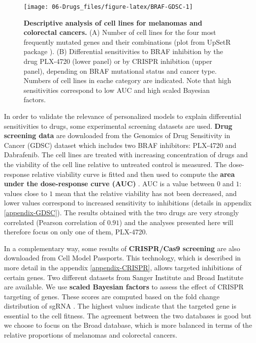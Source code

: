 \documentclass[a4paper,12pt,twoside,onecolumn,openright,final,oldfontcommands]{memoir}
\begin{document}
\begin{figure}

{\centering \texttt{[image: 06-Drugs\_files/figure-latex/BRAF-GDSC-1]} 

}

\caption[Descriptive analysis of cell lines for melanomas and colorectal cancers]{\textbf{Descriptive analysis of cell lines for
melanomas and colorectal cancers.} (A) Number of cell lines for the four
most frequently mutated genes and their combinations (plot from UpSetR
package \citep{conway2017upsetr}). (B) Differential sensitivities to
BRAF inhibition by the drug PLX-4720 (lower panel) or by CRISPR
inhibition (upper panel), depending on BRAF mutational status and cancer
type. Numbers of cell lines in eache category are indicated. Note that
high sensitivities correspond to low AUC and high scaled Bayesian
factors.}\label{fig:BRAF-GDSC}
\end{figure}











In order to validate the relevance of personalized models to explain
differential sensitivities to drugs, some experimental screening
datasets are used. \textbf{Drug screening data} are downloaded from the
Genomics of Drug Sensitivity in Cancer (GDSC) dataset
\citep{yang2012genomics} which includes two BRAF inhibitors: PLX-4720
and Dabrafenib. The cell lines are treated with increasing concentration
of drugs and the viability of the cell line relative to untreated
control is measured. The dose-response relative viability curve is
fitted and then used to compute the \textbf{area under the dose-response
curve (AUC)} \citep{vis2016multilevel}. AUC is a value between \(0\) and
\(1\): values close to \(1\) mean that the relative viability has not
been decreased, and lower values correspond to increased sensitivity to
inhibitions (details in appendix \ref{appendix-GDSC}). The results
obtained with the two drugs are very strongly correlated (Pearson
correlation of \(0.91\)) and the analyses presented here will therefore
focus on only one of them, PLX-4720.

In a complementary way, some results of \textbf{CRISPR/Cas9 screening}
are also downloaded from Cell Model Passports. This technology, which is
described in more detail in the appendix \ref{appendix-CRISPR}, allows
targeted inhibitions of certain genes. Two different datasets from
Sanger Institute \citep{behan2019prioritization} and Broad Institute
\citep{meyers2017computational} are available. We use \textbf{scaled
Bayesian factors} to assess the effect of CRISPR targeting of genes.
These scores are computed based on the fold change distribution of sgRNA
\citep{hart2016bagel}. The highest values indicate that the targeted
gene is essential to the cell fitness. The agreement between the two
databases is good \citep{dempster2019agreement} but we choose to focus
on the Broad database, which is more balanced in terms of the relative
proportions of melanomas and colorectal cancers.
\end{document}
